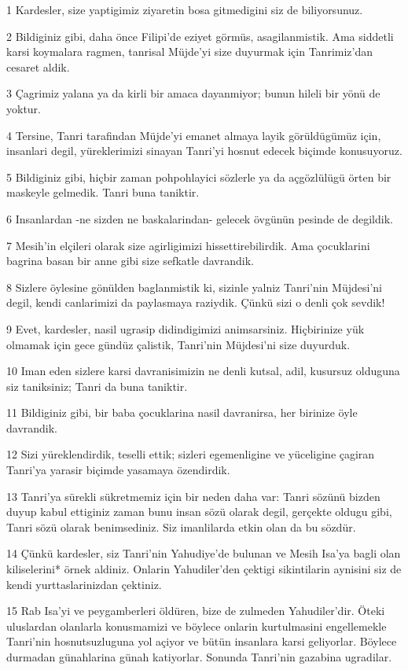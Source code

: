\par 1 Kardesler, size yaptigimiz ziyaretin bosa gitmedigini siz de biliyorsunuz.
\par 2 Bildiginiz gibi, daha önce Filipi'de eziyet görmüs, asagilanmistik. Ama siddetli karsi koymalara ragmen, tanrisal Müjde'yi size duyurmak için Tanrimiz'dan cesaret aldik.
\par 3 Çagrimiz yalana ya da kirli bir amaca dayanmiyor; bunun hileli bir yönü de yoktur.
\par 4 Tersine, Tanri tarafindan Müjde'yi emanet almaya layik görüldügümüz için, insanlari degil, yüreklerimizi sinayan Tanri'yi hosnut edecek biçimde konusuyoruz.
\par 5 Bildiginiz gibi, hiçbir zaman pohpohlayici sözlerle ya da açgözlülügü örten bir maskeyle gelmedik. Tanri buna taniktir.
\par 6 Insanlardan -ne sizden ne baskalarindan- gelecek övgünün pesinde de degildik.
\par 7 Mesih'in elçileri olarak size agirligimizi hissettirebilirdik. Ama çocuklarini bagrina basan bir anne gibi size sefkatle davrandik.
\par 8 Sizlere öylesine gönülden baglanmistik ki, sizinle yalniz Tanri'nin Müjdesi'ni degil, kendi canlarimizi da paylasmaya raziydik. Çünkü sizi o denli çok sevdik!
\par 9 Evet, kardesler, nasil ugrasip didindigimizi animsarsiniz. Hiçbirinize yük olmamak için gece gündüz çalistik, Tanri'nin Müjdesi'ni size duyurduk.
\par 10 Iman eden sizlere karsi davranisimizin ne denli kutsal, adil, kusursuz olduguna siz taniksiniz; Tanri da buna taniktir.
\par 11 Bildiginiz gibi, bir baba çocuklarina nasil davranirsa, her birinize öyle davrandik.
\par 12 Sizi yüreklendirdik, teselli ettik; sizleri egemenligine ve yüceligine çagiran Tanri'ya yarasir biçimde yasamaya özendirdik.
\par 13 Tanri'ya sürekli sükretmemiz için bir neden daha var: Tanri sözünü bizden duyup kabul ettiginiz zaman bunu insan sözü olarak degil, gerçekte oldugu gibi, Tanri sözü olarak benimsediniz. Siz imanlilarda etkin olan da bu sözdür.
\par 14 Çünkü kardesler, siz Tanri'nin Yahudiye'de bulunan ve Mesih Isa'ya bagli olan kiliselerini* örnek aldiniz. Onlarin Yahudiler'den çektigi sikintilarin aynisini siz de kendi yurttaslarinizdan çektiniz.
\par 15 Rab Isa'yi ve peygamberleri öldüren, bize de zulmeden Yahudiler'dir. Öteki uluslardan olanlarla konusmamizi ve böylece onlarin kurtulmasini engellemekle Tanri'nin hosnutsuzluguna yol açiyor ve bütün insanlara karsi geliyorlar. Böylece durmadan günahlarina günah katiyorlar. Sonunda Tanri'nin gazabina ugradilar.
